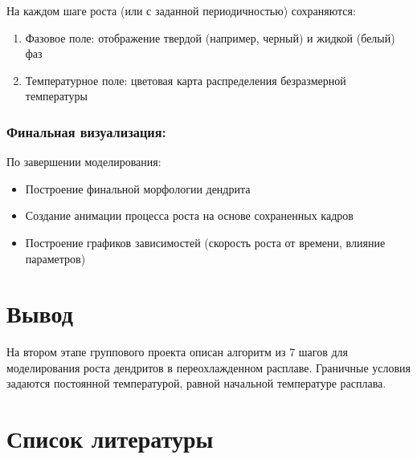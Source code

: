 \documentclass[
  12pt,
  a4paper,
  DIV=11,
  numbers=noendperiod]{scrreprt}
\providecommand{\tightlist}{%
  \setlength{\itemsep}{0pt}\setlength{\parskip}{0pt}}\usepackage{longtable,booktabs,array}
\begin{document}
На каждом шаге роста (или с заданной периодичностью) сохраняются:

\begin{enumerate}
\def\labelenumi{\arabic{enumi}.}
\item
  Фазовое поле: отображение твердой (например, черный) и жидкой (белый)
  фаз
\item
  Температурное поле: цветовая карта распределения безразмерной
  температуры
\end{enumerate}

\subsection{Финальная
визуализация:}\label{ux444ux438ux43dux430ux43bux44cux43dux430ux44f-ux432ux438ux437ux443ux430ux43bux438ux437ux430ux446ux438ux44f}

По завершении моделирования:

\begin{itemize}
\tightlist
\item
  Построение финальной морфологии дендрита
\item
  Создание анимации процесса роста на основе сохраненных кадров
\item
  Построение графиков зависимостей (скорость роста от времени, влияние
  параметров)
\end{itemize}

\chapter{Вывод}\label{ux432ux44bux432ux43eux434}

На втором этапе группового проекта описан алгоритм из 7 шагов для
моделирования роста дендритов в переохлажденном расплаве. Граничные
условия задаются постоянной температурой, равной начальной температуре
расплава.

\chapter*{Список
литературы}\label{ux441ux43fux438ux441ux43eux43a-ux43bux438ux442ux435ux440ux430ux442ux443ux440ux44b}
\end{document}
